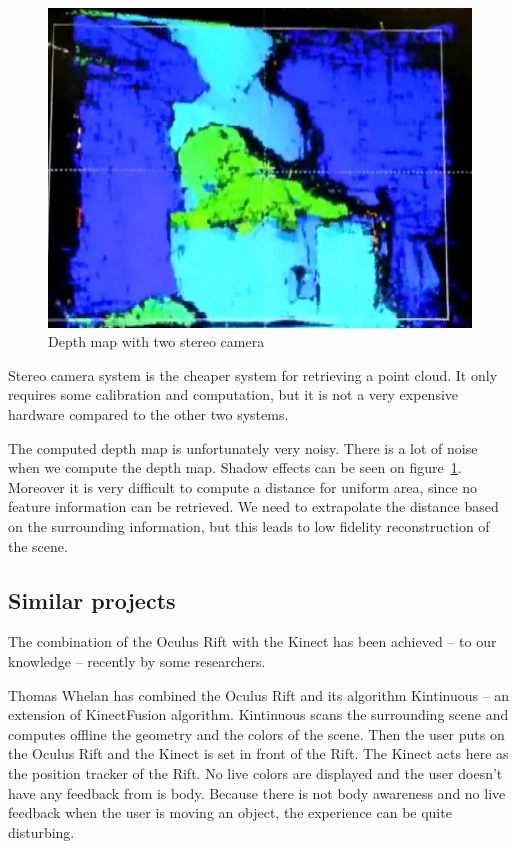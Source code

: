 \documentclass[12pt]{article}
\begin{document}
\begin{figure}[h]
  \centering
  \includegraphics[scale=0.3]{EtronDepth.png}
  \caption{\label{fig:etron} Depth map with two stereo camera}
\end{figure}

Stereo camera system is the cheaper system for retrieving a point cloud. It only requires some calibration and computation, but it is not a very expensive hardware compared to the other two systems.

The computed depth map is unfortunately very noisy. There is a lot of noise when we compute the depth map. Shadow effects can be seen on figure~\ref{fig:etron}. Moreover it is very difficult to compute a distance for uniform area, since no feature information can be retrieved. We need to extrapolate the distance based  on the surrounding information, but this leads to low fidelity reconstruction of the scene.

\subsection{Similar projects}
The combination of the Oculus Rift with the Kinect has been achieved -- to our knowledge -- recently by some researchers.

Thomas Whelan has combined the Oculus Rift and its algorithm Kintinuous \cite{KinRift} -- an extension of KinectFusion algorithm. Kintinuous scans the surrounding scene and computes offline the geometry and the colors of the scene. Then the user puts on the Oculus Rift and the Kinect is set in front of the Rift. The Kinect acts here as the position tracker of the Rift. No live colors are displayed and the user doesn't have any feedback from is body. Because there is not body awareness and no live feedback when the user is moving an object, the experience can be quite disturbing.
\end{document}
